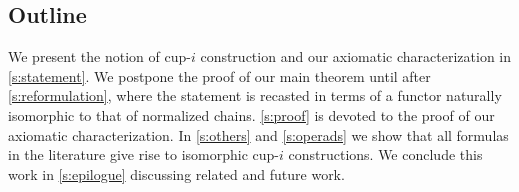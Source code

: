 %

\subsection*{Outline}

We present the notion of cup-$i$ construction and our axiomatic characterization in \cref{s:statement}.
We postpone the proof of our main theorem until after \cref{s:reformulation}, where the statement is recasted in terms of a functor naturally isomorphic to that of normalized chains.
\cref{s:proof} is devoted to the proof of our axiomatic characterization.
In \cref{s:others} and \cref{s:operads} we show that all formulas in the literature give rise to isomorphic \mbox{cup-$i$} constructions.
We conclude this work in \cref{s:epilogue} discussing related and future work.

